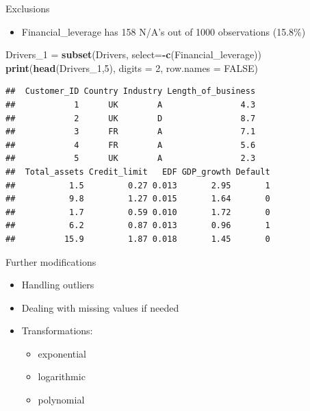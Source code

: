 \documentclass[9pt,ignorenonframetext,]{beamer}
\newenvironment{Shaded}{\begin{snugshade}}{\end{snugshade}}
\newcommand{\KeywordTok}[1]{\textcolor[rgb]{0.13,0.29,0.53}{\textbf{#1}}}
\newcommand{\DataTypeTok}[1]{\textcolor[rgb]{0.13,0.29,0.53}{#1}}
\newcommand{\DecValTok}[1]{\textcolor[rgb]{0.00,0.00,0.81}{#1}}
\newcommand{\StringTok}[1]{\textcolor[rgb]{0.31,0.60,0.02}{#1}}
\newcommand{\OtherTok}[1]{\textcolor[rgb]{0.56,0.35,0.01}{#1}}
\newcommand{\OperatorTok}[1]{\textcolor[rgb]{0.81,0.36,0.00}{\textbf{#1}}}
\newcommand{\NormalTok}[1]{#1}
\providecommand{\tightlist}{%
  \setlength{\itemsep}{0pt}\setlength{\parskip}{0pt}}
\begin{document}
\begin{frame}[fragile]{Exclusions}

\begin{itemize}
\tightlist
\item
  Financial\_leverage has 158 N/A's out of 1000 observations (15.8\%)
\end{itemize}

\begin{Shaded}
\begin{Highlighting}[]
\NormalTok{Drivers_}\DecValTok{1}\NormalTok{ =}\StringTok{ }\KeywordTok{subset}\NormalTok{(Drivers, }\DataTypeTok{select=}\OperatorTok{-}\KeywordTok{c}\NormalTok{(Financial_leverage))}
\KeywordTok{print}\NormalTok{(}\KeywordTok{head}\NormalTok{(Drivers_}\DecValTok{1}\NormalTok{,}\DecValTok{5}\NormalTok{), }\DataTypeTok{digits =} \DecValTok{2}\NormalTok{, }\DataTypeTok{row.names =} \OtherTok{FALSE}\NormalTok{)}
\end{Highlighting}
\end{Shaded}

\begin{verbatim}
##  Customer_ID Country Industry Length_of_business
##            1      UK        A                4.3
##            2      UK        D                8.7
##            3      FR        A                7.1
##            4      FR        A                5.6
##            5      UK        A                2.3
##  Total_assets Credit_limit   EDF GDP_growth Default
##           1.5         0.27 0.013       2.95       1
##           9.8         1.27 0.015       1.64       0
##           1.7         0.59 0.010       1.72       0
##           6.2         0.87 0.013       0.96       1
##          15.9         1.87 0.018       1.45       0
\end{verbatim}

\end{frame}

\begin{frame}{Further modifications}

\begin{itemize}
\tightlist
\item
  Handling outliers
\item
  Dealing with missing values if needed
\item
  Transformations:

  \begin{itemize}
  \tightlist
  \item
    exponential
  \item
    logarithmic
  \item
    polynomial
  \end{itemize}
\end{itemize}

\end{frame}
\end{document}
